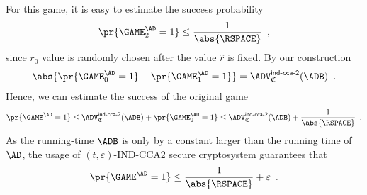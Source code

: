\documentclass{crypto-exercise}
\newcommand{\CS}{\mathfrak{C}}
\newcommand{\ADVCCATWO}[2]{\ADV^{\mathsf{ind\text{-}cca\text{-}2}}_{#1}(#2)}
\begin{document}
\begin{solution}
For this game, it is easy to estimate the success probability
\begin{align*}
\pr{\GAME_2^\AD=1}\leq\frac{1}{\abs{\RSPACE}}\enspace,
\end{align*}
since $r_0$ value is randomly chosen after the value $\hat{r}$ is fixed. By our construction 
\begin{align*}
\abs{\pr{\GAME_0^\AD=1}-\pr{\GAME_1^\AD=1}}=\ADVCCATWO{\CS}{\ADB}\enspace.
\end{align*}
Hence, we can estimate the success of the original game
\begin{align*}
\pr{\GAME^\AD=1}\leq \ADVCCATWO{\CS}{\ADB} + \pr{\GAME_2^\AD=1}\leq \ADVCCATWO{\CS}{\ADB}+ \frac{1}{\abs{\RSPACE}}\enspace.
\end{align*}
As the running-time $\ADB$ is only by a constant larger than the running time of $\AD$, the usage of $(t,\varepsilon)$-IND-CCA2 secure cryptosystem guarantees  that
\begin{align*}
\pr{\GAME^\AD=1}\leq \frac{1}{\abs{\RSPACE}}+ \varepsilon\enspace.
\end{align*}
\end{solution}
\end{document}
